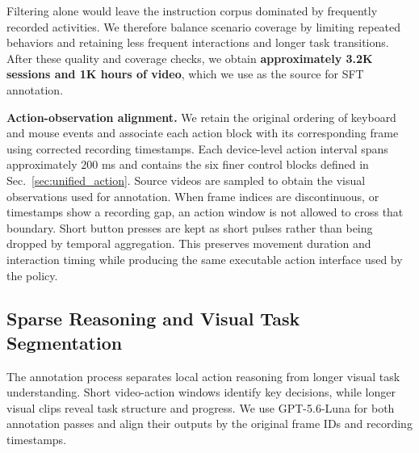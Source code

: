 Filtering alone would leave the instruction corpus dominated by frequently recorded activities. We therefore balance scenario coverage by limiting repeated behaviors and retaining less frequent interactions and longer task transitions. 
After these quality and coverage checks, we obtain \textbf{approximately 3.2K sessions and 1K hours of video}, which we use as the source for SFT annotation.

\textbf{Action-observation alignment.}
We retain the original ordering of keyboard and mouse events and associate each action block with its corresponding frame using corrected recording timestamps. Each device-level action interval spans approximately $200$ ms and contains the six finer control blocks defined in Sec.~\ref{sec:unified_action}. Source videos are sampled to obtain the visual observations used for annotation. When frame indices are discontinuous, or timestamps show a recording gap, an action window is not allowed to cross that boundary. Short button presses are kept as short pulses rather than being dropped by temporal aggregation. This preserves movement duration and interaction timing while producing the same executable action interface used by the policy. 

\subsection{Sparse Reasoning and Visual Task Segmentation}
\label{sec:data_annotation}

The annotation process separates local action reasoning from longer visual task understanding. Short video-action windows identify key decisions, while longer visual clips reveal task structure and progress. We use GPT-5.6-Luna for both annotation passes and align their outputs by the original frame IDs and recording timestamps. 

